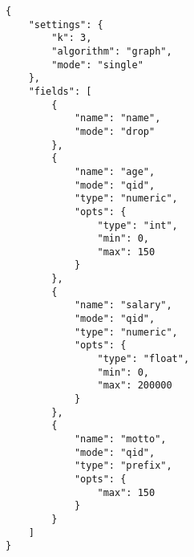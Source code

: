 \begin{lstlisting}[caption=Modified input format,label=lst:modified_format,float,floatplacement=H]
{
    "settings": {
        "k": 3,
        "algorithm": "graph",
        "mode": "single"
    },
    "fields": [
        {
            "name": "name",
            "mode": "drop"
        },
        {
            "name": "age",
            "mode": "qid",
            "type": "numeric",
            "opts": {
                "type": "int",
                "min": 0,
                "max": 150
            }
        },
        {
            "name": "salary",
            "mode": "qid",
            "type": "numeric",
            "opts": {
                "type": "float",
                "min": 0,
                "max": 200000
            }
        },
        {
            "name": "motto",
            "mode": "qid",
            "type": "prefix",
            "opts": {
                "max": 150
            }
        }
    ]
}
\end{lstlisting}
